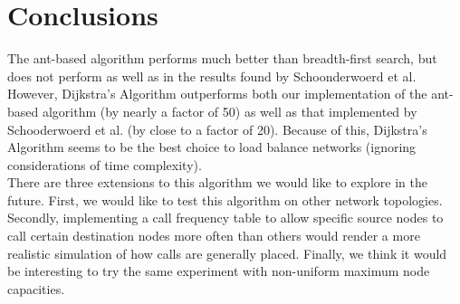 
\section{Conclusions}
\label{sec:concl}

The ant-based algorithm performs much better than breadth-first search, but does not perform as well as in the results found by Schoonderwoerd et al. However, Dijkstra’s Algorithm outperforms both our implementation of the ant-based algorithm (by nearly a factor of 50) as well as that implemented by Schooderwoerd et al. (by close to a factor of 20). Because of this, Dijkstra’s Algorithm seems to be the best choice to load balance networks (ignoring considerations of time complexity).\\

There are three extensions to this algorithm we would like to explore in the future. First, we would like to test this algorithm on other network topologies. Secondly, implementing a call frequency table to allow specific source nodes to call certain destination nodes more often than others would render a more realistic simulation of how calls are generally placed. Finally, we think it would be interesting to try the same experiment with non-uniform maximum node capacities.